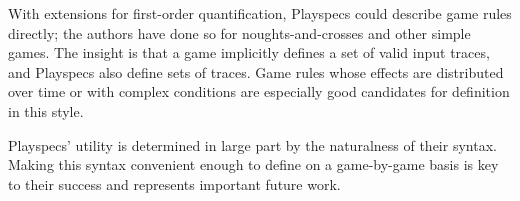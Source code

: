 \documentclass[letterpaper]{article}
\begin{document}
With extensions for first-order quantification, Playspecs could describe game rules directly; the authors have done so for noughts-and-crosses and other simple games. The insight is that a game implicitly defines a set of valid input traces, and Playspecs also define sets of traces. Game rules whose effects are distributed over time or with complex conditions are especially good candidates for definition in this style.

Playspecs' utility is determined in large part by the naturalness of their syntax. Making this syntax convenient enough to define on a game-by-game basis is key to their success and represents important future work.

{
\small


}
\end{document}
